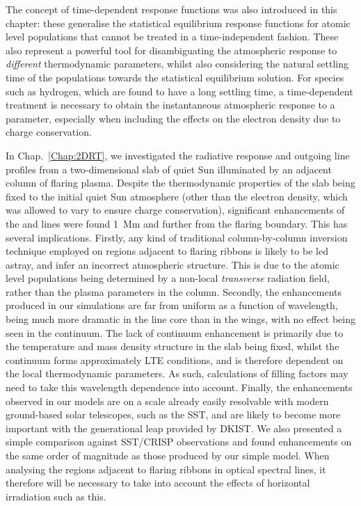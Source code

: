 The concept of time-dependent response functions was also introduced in this chapter: these generalise the statistical equilibrium response functions for atomic level populations that cannot be treated in a time-independent fashion.
These also represent a powerful tool for disambiguating the atmospheric response to \emph{different} thermodynamic parameters, whilst also considering the natural settling time of the populations towards the statistical equilibrium solution.
For species such as hydrogen, which are found to have a long settling time, a time-dependent treatment is necessary to obtain the instantaneous atmospheric response to a parameter, especially when including the effects on the electron density due to charge conservation.

In Chap.~\ref{Chap:2DRT}, we investigated the radiative response and outgoing line profiles from a two-dimensional slab of quiet Sun illuminated by an adjacent column of flaring plasma.
Despite the thermodynamic properties of the slab being fixed to the initial quiet Sun atmosphere (other than the electron density, which was allowed to vary to ensure charge conservation), significant enhancements of the \Ha{} and \CaLine{} lines were found \SI{1}{\mega\m} and further from the flaring boundary.
This has several implications.
Firstly, any kind of traditional column-by-column inversion technique employed on regions adjacent to flaring ribbons is likely to be led astray, and infer an incorrect atmospheric structure.
This is due to the atomic level populations being determined by a non-local \emph{transverse} radiation field, rather than the plasma parameters in the column.
Secondly, the enhancements produced in our simulations are far from uniform as a function of wavelength, being much more dramatic in the line core than in the wings, with no effect being seen in the continuum.
The lack of continuum enhancement is primarily due to the temperature and mass density structure in the slab being fixed, whilst the continuum forms approximately LTE conditions, and is therefore dependent on the local thermodynamic parameters.
As such, calculations of filling factors may need to take this wavelength dependence into account.
Finally, the enhancements observed in our models are on a scale already easily resolvable with modern ground-based solar telescopes, such as the SST, and are likely to become more important with the generational leap provided by DKIST.
We also presented a simple comparison against SST/CRISP observations and found enhancements on the same order of magnitude as those produced by our simple model.
When analysing the regions adjacent to flaring ribbons in optical spectral lines, it therefore will be necessary to take into account the effects of horizontal irradiation such as this.

